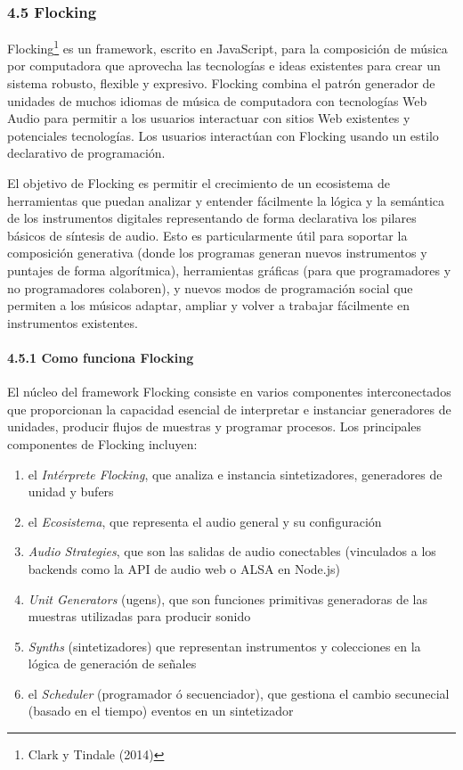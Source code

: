 \documentclass[]{article}
\let\oldparagraph\paragraph
\renewcommand{\paragraph}[1]{\oldparagraph{#1}\mbox{}}
\begin{document}
\hypertarget{flocking}{%
\subsubsection{4.5 Flocking}\label{flocking}}

Flocking\footnote{Clark y Tindale (2014)} es un framework, escrito en
JavaScript, para la composición de música por computadora que aprovecha
las tecnologías e ideas existentes para crear un sistema robusto,
flexible y expresivo. Flocking combina el patrón generador de unidades
de muchos idiomas de música de computadora con tecnologías Web Audio
para permitir a los usuarios interactuar con sitios Web existentes y
potenciales tecnologías. Los usuarios interactúan con Flocking usando un
estilo declarativo de programación.

El objetivo de Flocking es permitir el crecimiento de un ecosistema de
herramientas que puedan analizar y entender fácilmente la lógica y la
semántica de los instrumentos digitales representando de forma
declarativa los pilares básicos de síntesis de audio. Esto es
particularmente útil para soportar la composición generativa (donde los
programas generan nuevos instrumentos y puntajes de forma algorítmica),
herramientas gráficas (para que programadores y no programadores
colaboren), y nuevos modos de programación social que permiten a los
músicos adaptar, ampliar y volver a trabajar fácilmente en instrumentos
existentes.

\hypertarget{como-funciona-flocking}{%
\paragraph{4.5.1 Como funciona Flocking}\label{como-funciona-flocking}}

El núcleo del framework Flocking consiste en varios componentes
interconectados que proporcionan la capacidad esencial de interpretar e
instanciar generadores de unidades, producir flujos de muestras y
programar procesos. Los principales componentes de Flocking incluyen:

\begin{enumerate}
\def\labelenumi{\arabic{enumi}.}
\item
  el \emph{Intérprete Flocking}, que analiza e instancia sintetizadores,
  generadores de unidad y bufers
\item
  el \emph{Ecosistema}, que representa el audio general y su
  configuración
\item
  \emph{Audio Strategies}, que son las salidas de audio conectables
  (vinculados a los backends como la API de audio web o ALSA en Node.js)
\item
  \emph{Unit Generators} (ugens), que son funciones primitivas
  generadoras de las muestras utilizadas para producir sonido
\item
  \emph{Synths} (sintetizadores) que representan instrumentos y
  colecciones en la lógica de generación de señales
\item
  el \emph{Scheduler} (programador ó secuenciador), que gestiona el
  cambio secunecial (basado en el tiempo) eventos en un sintetizador
\end{enumerate}
\end{document}
